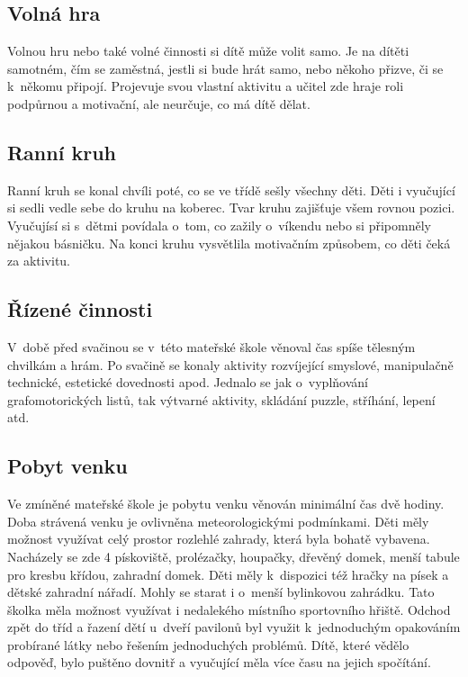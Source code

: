 		\subsection{Volná hra}

			Volnou hru nebo také volné činnosti si dítě může volit samo. Je na dítěti samotném, čím se zaměstná, jestli si bude hrát samo, nebo někoho přizve, či se k někomu připojí. Projevuje svou vlastní aktivitu a učitel zde hraje roli podpůrnou a motivační, ale neurčuje, co má dítě dělat. 

		\subsection{Ranní kruh}

			Ranní kruh se konal chvíli poté, co se ve třídě sešly všechny děti. Děti i vyučující si sedli vedle sebe do kruhu na koberec. Tvar kruhu zajišťuje všem rovnou pozici. Vyučujísí si s~dětmi povídala o~tom, co zažily o~víkendu nebo si připomněly nějakou básničku. Na konci kruhu vysvětlila motivačním způsobem, co děti čeká za aktivitu. 

		\subsection{Řízené činnosti}
		 	V~době před svačinou se v~této mateřské škole věnoval čas spíše tělesným chvilkám a hrám. Po svačině se konaly aktivity rozvíjející smyslové, manipulačně technické, estetické dovednosti apod. Jednalo se jak o~vyplňování grafomotorických listů, tak výtvarné aktivity, skládání puzzle, stříhání, lepení atd. 

		\subsection{Pobyt venku}
			Ve zmíněné mateřské škole je pobytu venku věnován minimální čas dvě hodiny. Doba strávená venku je ovlivněna meteorologickými podmínkami. Děti měly možnost využívat celý prostor rozlehlé zahrady, která byla bohatě vybavena. Nacházely se zde 4 pískoviště, prolézačky, houpačky, dřevěný domek, menší tabule pro kresbu křídou, zahradní domek. Děti měly k~dispozici též hračky na písek a dětské zahradní nářadí. Mohly se starat i o~menší bylinkovou zahrádku. Tato školka měla možnost využívat i nedalekého místního sportovního hřiště. Odchod zpět do tříd a řazení dětí u~dveří pavilonů byl využit k~jednoduchým opakováním probírané látky nebo řešením jednoduchých problémů. Dítě, které vědělo odpověď, bylo puštěno dovnitř a vyučující měla více času na jejich spočítání.

